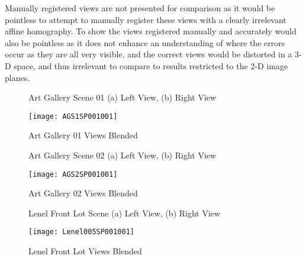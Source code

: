Manually registered views are not presented for comparison as it would be pointless to attempt to manually register these views with a clearly irrelevant affine homography. To show the views registered manually and accurately would also be pointless as it does not enhance an understanding of where the errors occur as they are all very visible, and the correct views would be distorted in a 3-D space, and thus irrelevant to compare to results restricted to the 2-D image planes.

\newpage

\begin{figure}
\centering
{}
\caption{Art Gallery Scene 01 (a) Left View, (b) Right View}
\label{ArtGallery1Images}
\end{figure}

\begin{figure}
\centering
\texttt{[image: AGS1SP001001]}
\caption{Art Gallery 01 Views Blended}
\label{ArtGallery1Stitched}
\end{figure}




\begin{figure}
\centering
{}
\caption{Art Gallery Scene 02 (a) Left View, (b) Right View}
\label{ArtGallery2Images}
\end{figure}

\begin{figure}
\label{ArtGallery2Stitched}
\centering
\texttt{[image: AGS2SP001001]}
\caption{Art Gallery 02 Views Blended}
\end{figure}



\begin{figure}
\centering
{}
\caption{Lenel Front Lot Scene (a) Left View, (b) Right View}
\label{Lenel5Images}
\end{figure}

\begin{figure}
\centering
\texttt{[image: Lenel005SP001001]}
\caption{Lenel Front Lot Views Blended}
\label{Lenel5Stitched}
\end{figure}



